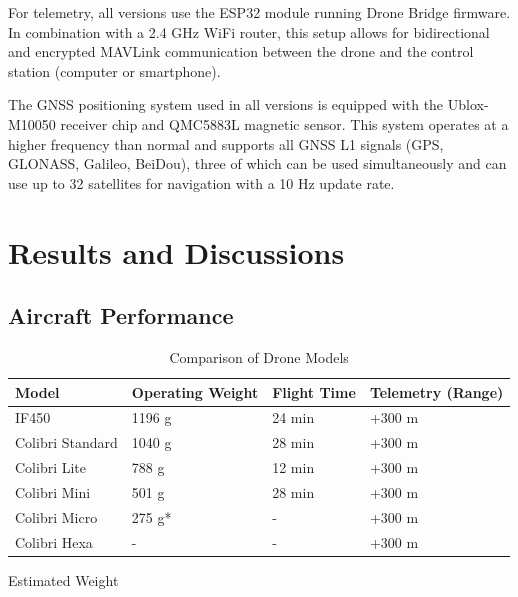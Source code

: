 \documentclass[conference]{IEEEtran}
\begin{document}
For telemetry, all versions use the ESP32 module running Drone Bridge firmware. In combination with a 2.4 GHz WiFi router, this setup allows for bidirectional and encrypted MAVLink communication between the drone and the control station (computer or smartphone).

The GNSS positioning system used in all versions is equipped with the Ublox-M10050 receiver chip and QMC5883L magnetic sensor. This system operates at a higher frequency than normal and supports all GNSS L1 signals (GPS, GLONASS, Galileo, BeiDou), three of which can be used simultaneously and can use up to 32 satellites for navigation with a 10 Hz update rate.

\section{Results and Discussions}

\subsection{Aircraft Performance}

\begin{table}[htbp]
\centering
\caption{Comparison of Drone Models}
\label{tab:drone_comparison}
\begin{tabularx}{\columnwidth}{|l|X|X|X|}
\hline
\textbf{Model}         & \textbf{Operating Weight} & \textbf{Flight Time} & \textbf{Telemetry (Range)} \\ \hline
IF450                  & 1196 g                    & 24 min               & +300 m                     \\ \hline
Colibri Standard       & 1040 g                    & 28 min               & +300 m                     \\ \hline
Colibri Lite           & 788 g                     & 12 min               & +300 m                     \\ \hline
Colibri Mini           & 501 g                     & 28 min               & +300 m                     \\ \hline
Colibri Micro          & 275 g*                    & -                    & +300 m                     \\ \hline
Colibri Hexa           & -                         & -                    & +300 m                     \\ \hline
\end{tabularx}
\newline
\small *Estimated Weight
\end{table}
\end{document}
